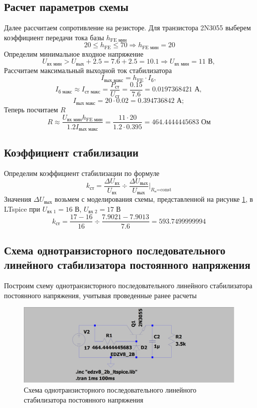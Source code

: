 \documentclass[a4paper, 12pt]{article}
\begin{document}
    
    \subsection{Расчет параметров схемы}
    Далее рассчитаем сопротивление на резисторе.
    Для транзистора 2N3055 выберем коэффициент передачи тока базы $h_{\text{FE мин}}$
    $$\,20\leq h_{\text{FE}}\leq70\Rightarrow h_{\text{FE мин}}=20$$
    Определим минимальное входное напряжение
    $$
    U_{\text{вх мин}}>U_{\text{вых}}+2.5=7.6+2.5=10.1\Rightarrow U_{\text{вх мин}}=11\text{ В},
    $$
    Рассчитаем максимальный выходной ток стабилизатора
    $$
    I_{\text{вых макс}}=h_{\text{FE}}\cdot I_{\text{б}},
    $$
    $$
    I_{\text{б макс}}\approx I_{\text{ст макс}}=\dfrac{P_{\text{ст}}}{U_{\text{ст}}}=\dfrac{0.15}{7.6}=0.0197368421\text{ А},
    $$
    $$
    I_{\text{вых макс}}=20\cdot0.02=0.394736842\text{ А};
    $$
    Теперь посчитаем $R$
    $$
    R\approx\dfrac{U_{\text{вх мин}}h_{\text{FE мин}}}{1.2I_{\text{вых макс}}}=\dfrac{11\cdot20}{1.2\cdot0.395}=464.4444445683\text{ Ом}
    $$


    \subsection{Коэффициент стабилизации}
    Определим коэффициент стабилизации по формуле
    $$
    k_{\text{ст}}=\dfrac{\Delta U_{\text{вх}}}{U_{\text{вх}}}\div\dfrac{\Delta U_{\text{вых}}}{U_{\text{вых}}}\bigg|_{R_\text{н}\text{=const}}
    $$
    Значения $\Delta U_{\text{вых}}$ возьмем с моделирования схемы, представленной на рисунке \ref{fig:2task_scheme_AC}, в LTspice
    при $U_{\text{вх 1}}=16$ В, $U_{\text{вх 2}}=17$ В
    $$
    k_{\text{ст}}=\dfrac{17-16}{16}\div\dfrac{7.9021-7.9013}{7.6}=593.7499999994
    $$


    \subsection{Схема однотранзисторного последовательного линейного стабилизатора постоянного напряжения}
    Построим схему однотранзисторного последовательного линейного стабилизатора постоянного напряжения, учитывая проведенные ранее расчеты
    \begin{figure}[H]
        \centering
        \includegraphics[scale=0.22]{2task_scheme_AC.png}
        \captionsetup{skip=0pt}
        \caption{Схема однотранзисторного последовательного линейного стабилизатора постоянного напряжения}
        \label{fig:2task_scheme_AC}
    \end{figure}
\end{document}
